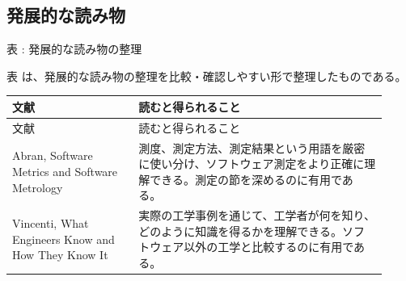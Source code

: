 \subsection{発展的な読み物}
\par\smallskip\noindent{}\label{tab:ch18-16}表 \thetable: 発展的な読み物の整理\par\smallskip
表 \thetable は、発展的な読み物の整理を比較・確認しやすい形で整理したものである。\par\smallskip
\begin{longtable}{>{\raggedright\arraybackslash}p{0.31\linewidth}>{\raggedright\arraybackslash}p{0.61\linewidth}}
\toprule
文献 & 読むと得られること \\
\midrule
\endfirsthead
\toprule
文献 & 読むと得られること \\
\midrule
\endhead
Abran, Software Metrics and Software Metrology & 測度、測定方法、測定結果という用語を厳密に使い分け、ソフトウェア測定をより正確に理解できる。測定の節を深めるのに有用である。 \\
Vincenti, What Engineers Know and How They Know It & 実際の工学事例を通じて、工学者が何を知り、どのように知識を得るかを理解できる。ソフトウェア以外の工学と比較するのに有用である。 \\
\bottomrule
\end{longtable}
